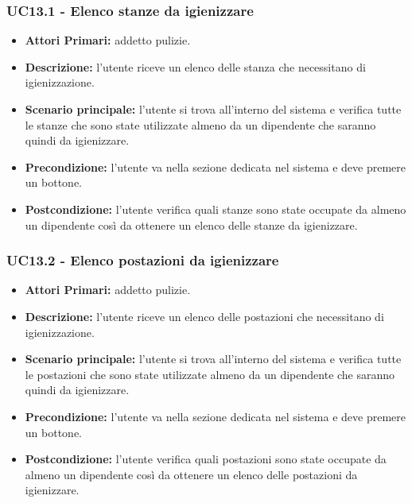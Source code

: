 \subsubsection{UC13.1 - Elenco stanze da igienizzare}
\begin{itemize}
           	\item\textbf{Attori Primari:} addetto pulizie.
           	\item\textbf{Descrizione:} l'utente riceve un elenco delle stanza che necessitano di igienizzazione.
           	\item\textbf{Scenario principale:} l'utente si trova all'interno del sistema e verifica tutte le stanze che sono state utilizzate almeno da un dipendente 				che saranno quindi da igienizzare.
           	\item\textbf{Precondizione:} l'utente va nella sezione dedicata nel sistema e deve premere un bottone.
           	\item\textbf{Postcondizione:} l'utente verifica quali stanze sono state occupate da almeno un dipendente così da ottenere un elenco delle stanze da 				igienizzare.
\end{itemize}
\subsubsection{UC13.2 - Elenco postazioni da igienizzare}
\begin{itemize}
           	\item\textbf{Attori Primari:} addetto pulizie.
           	\item\textbf{Descrizione:} l'utente riceve un elenco delle postazioni che necessitano di igienizzazione.
           	\item\textbf{Scenario principale:} l'utente si trova all'interno del sistema e verifica tutte le postazioni che sono state utilizzate almeno da un dipendente 	che saranno quindi da igienizzare.
           	\item\textbf{Precondizione:} l'utente va nella sezione dedicata nel sistema e deve premere un bottone.
           	\item\textbf{Postcondizione:} l'utente verifica quali postazioni sono state occupate da almeno un dipendente così da ottenere un elenco delle postazioni da igienizzare.
\end{itemize}

